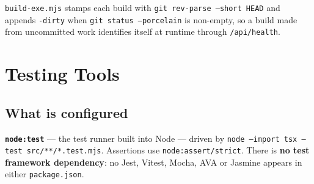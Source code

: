 \documentclass[11pt,a4paper]{report}
\newcommand{\code}[1]{\texttt{\small #1}}
\DeclareRobustCommand{\file}[1]{{\small\nolinkurl{#1}}}
\begin{document}
\code{build-exe.mjs} stamps each build with \code{git rev-parse --short HEAD} and
appends \code{-dirty} when \code{git status --porcelain} is non-empty, so a build
made from uncommitted work identifies itself at runtime through
\file{/api/health}.

\chapter{Testing Tools}
\label{sec:testing}

\section{What is configured}

\textbf{\code{node:test}} --- the test runner built into Node --- driven by
\code{node --import tsx --test src/**/*.test.mjs}. Assertions use
\code{node:assert/strict}. There is \textbf{no test framework dependency}: no
Jest, Vitest, Mocha, AVA or Jasmine appears in either \file{package.json}.
\end{document}
